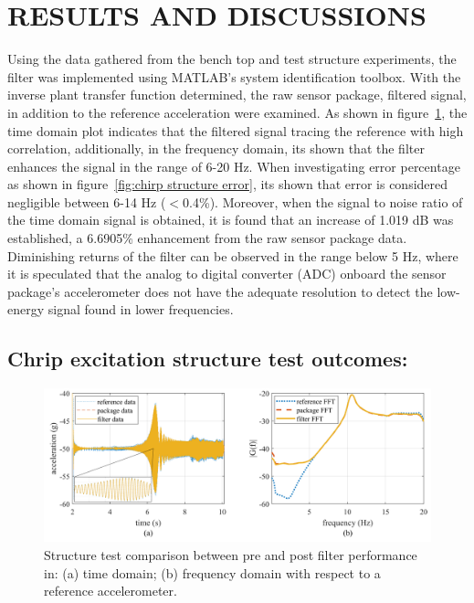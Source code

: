 \documentclass[]{spie}  %
\begin{document}
	\section{RESULTS AND DISCUSSIONS}
	Using the data gathered from the bench top and test structure experiments, the filter was implemented using MATLAB’s system identification toolbox. With the inverse plant transfer function determined, the raw sensor package, filtered signal, in addition to the reference acceleration were examined. As shown in figure~\ref{fig:Chrip Structure Test}, the time domain plot indicates that the filtered signal tracing the reference with high correlation, additionally, in the frequency domain, its shown that the filter enhances the signal in the range of 6-20 Hz. When investigating error percentage as shown in figure~\ref{fig:chirp structure error}, its shown that error is considered negligible between 6-14 Hz ($<$0.4\%). Moreover, when the signal to noise ratio of the time domain signal is obtained, it is found that an increase of 1.019 dB was established, a 6.6905\% enhancement from the raw sensor package data. Diminishing returns of the filter can be observed in the range below 5 Hz, where it is speculated that the analog to digital converter (ADC) onboard the sensor package’s accelerometer does not have the adequate resolution to detect the low-energy signal found in lower frequencies.
	
	\subsection{Chrip excitation structure test outcomes:}
	
	\begin{figure} [H]
		\centering
		\includegraphics[width=6 in]{figures/Chrip Structure Test.png}
		\caption{Structure test comparison between pre and post filter performance in: (a) time domain; (b) frequency domain with respect to a reference accelerometer.}
		\label{fig:Chrip Structure Test} 
	\end{figure} 
	
\end{document}
